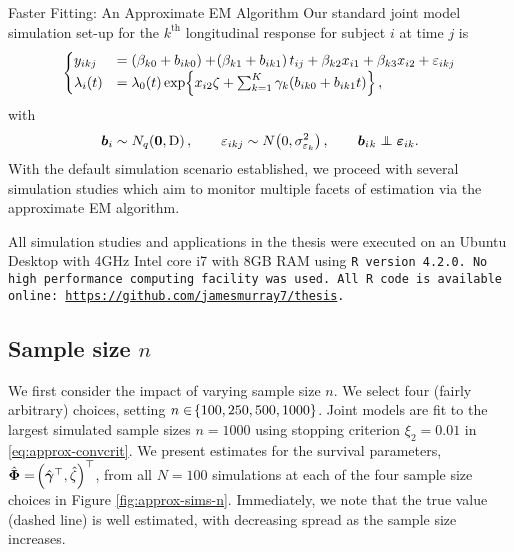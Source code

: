 \begin{chapter}{\label{cha:approx}Faster Fitting: An Approximate EM Algorithm}
  Our standard joint model simulation set-up for the $k^\mathrm{th}$ longitudinal response for subject $i$ at time $j$ is 
  \begin{equation}
      \begin{aligned}
          \begin{cases}
              y_{ikj} &= \left(\beta_{k0} + b_{ik0}\right) + \!\left(\beta_{k1} + b_{ik1}\right) t_{ij} + \beta_{k2}x_{i1} + \beta_{k3}x_{i2} + \varepsilon_{ikj}\\
              \lambda_i(t) &= \lambda_0\!\left( t\right)\exp\!\left\{ x_{i2}\zeta + \sum_{k=1}^K\gamma_k\!\left( b_{ik0} + b_{ik1}t\right)\right\},
          \end{cases}
      \end{aligned}
  \end{equation}
  with
  \begin{equation*}
      \bm{b}_i\sim N_q\!\left( \bm{0},\mathrm{D}\right),\qquad\varepsilon_{ikj}\sim N\!\left(0, \sigma_{\varepsilon_k}^2\right),\qquad \bm{b}_i{_k}\perp\!\!\!\!\perp\bm{\varepsilon}_{ik}.
  \end{equation*}
  With the default simulation scenario established, we proceed with several simulation studies which aim to monitor multiple facets of estimation via the approximate EM algorithm.

  All simulation studies and applications in the thesis were executed on an Ubuntu Desktop with 4GHz Intel core i7 with 8GB RAM using \tt{R} version 4.2.0. No high performance computing facility was used. All \tt{R} code is available online: \url{https://github.com/jamesmurray7/thesis}.

  \subsection{Sample size \texorpdfstring{$n$}{n}}\label{sec:approx-sims-n}
  We first consider the impact of varying sample size $n$. We select four (fairly arbitrary) choices, setting $n\in\!\left\{100,250,500,1000\right\}$. Joint models are fit to the largest simulated sample sizes $n=1000$ using stopping criterion $\xi_2=0.01$ in \eqref{eq:approx-convcrit}. We present estimates for the survival parameters, $\hat{\bm{\Phi}}=\!\left(\hat{\bm{\gamma}}^\top,\hat{\zeta}\right)^\top$, from all $N=100$ simulations at each of the four sample size choices in Figure \ref{fig:approx-sims-n}. Immediately, we note that the true value (dashed line) is well estimated, with decreasing spread as the sample size increases. 
  

\end{chapter}
